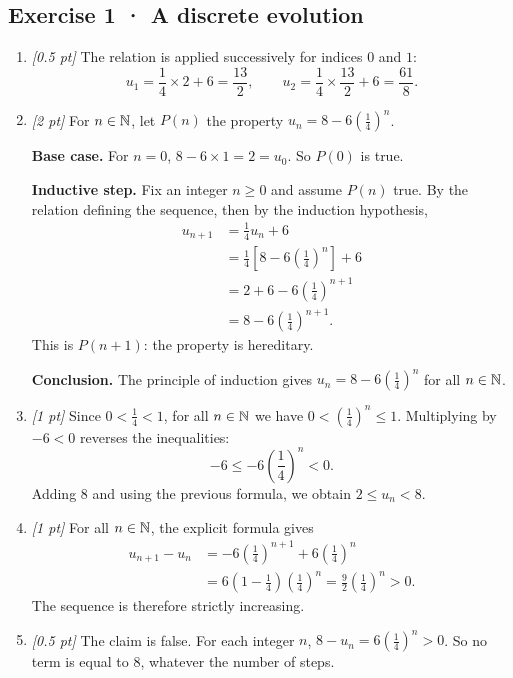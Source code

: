 \subsection*{Exercise 1 · A discrete evolution}\begin{enumerate}

\item \textit{[0.5 pt]} The relation is applied successively for indices $0$ and $1$:\[u_1=\frac{1}{4}\times 2+6=\frac{13}{2},\qquad u_2=\frac{1}{4}\times \frac{13}{2}+6=\frac{61}{8}.\]

\item \textit{[2 pt]} For $n\in\mathbb N$, let $P(n)$ the property $u_n=8-6\left(\frac{1}{4}\right)^n$.
\par\smallskip\textbf{Base case.} For $n=0$, $8-6\times1=2=u_0$. So $P(0)$ is true.
\par\smallskip\textbf{Inductive step.} Fix an integer $n\ge0$ and assume $P(n)$ true. By the relation defining the sequence, then by the induction hypothesis,
\[\begin{aligned}u_{n+1}&=\frac{1}{4}u_n+6\\
&=\frac{1}{4}\left[8-6\left(\frac{1}{4}\right)^n\right]+6\\
&=2+6-6\left(\frac{1}{4}\right)^{n+1}\\
&=8-6\left(\frac{1}{4}\right)^{n+1}.
\end{aligned}\]
This is $P(n+1)$: the property is hereditary.
\par\smallskip\textbf{Conclusion.} The principle of induction gives $u_n=8-6\left(\frac{1}{4}\right)^n$ for all $n\in\mathbb N$.

\item \textit{[1 pt]} Since $0<\frac{1}{4}<1$, for all $n\in\mathbb N$ we have $0<(\frac{1}{4})^n\le1$. Multiplying by $-6<0$ reverses the inequalities:
\[-6\le-6(\frac{1}{4})^n<0.\]
Adding $8$ and using the previous formula, we obtain $2\le u_n<8$.

\item \textit{[1 pt]} For all $n\in\mathbb N$, the explicit formula gives
\[\begin{aligned}u_{n+1}-u_n&=-6(\frac{1}{4})^{n+1}+6(\frac{1}{4})^n\\&=6(1-\frac{1}{4})(\frac{1}{4})^n=\frac{9}{2}(\frac{1}{4})^n>0.\end{aligned}\]
The sequence is therefore strictly increasing.

\item \textit{[0.5 pt]} The claim is false. For each integer $n$, $8-u_n=6(\frac{1}{4})^n>0$. So no term is equal to $8$, whatever the number of steps.

\end{enumerate}

